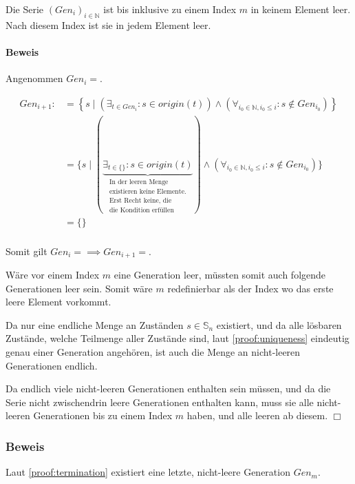 \documentclass[a4paper,10pt,ngerman]{scrartcl}
\begin{document}
Die Serie \((Gen_i)_{i\in\mathbb{N}}\) ist bis inklusive zu einem Index \(m\) in keinem Element leer. Nach diesem Index ist sie in jedem Element leer.

\paragraph{Beweis}

Angenommen \(Gen_i = {}\).

\begin{align*}
    Gen_{i+1} :&= \left\{ s \mid \left(\exists_{t \in Gen_i} : s \in origin(t)\right) \land \left(\forall_{i_0\in\mathbb{N}, i_0 \leq i}: s \notin Gen_{i_0}\right) \right\} \\
    & = \{ s \mid (\underbrace{\exists_{t \in \{\}} : s \in origin(t)}_{\substack{\text{In der leeren Menge}\\\text{existieren keine Elemente.}\\\text{Erst Recht keine, die}\\\text{die Kondition erfüllen}}}) \land (\forall_{i_0\in\mathbb{N}, i_0 \leq i}: s \notin Gen_{i_0}) \} \\
    & = \{\} \\
\end{align*}

Somit gilt \(Gen_i = {} \implies Gen_{i+1} = {}\).

Wäre vor einem Index \(m\) eine Generation leer, müssten somit auch folgende Generationen leer sein. Somit wäre \(m\) redefinierbar als der Index wo das erste leere Element vorkommt.

Da nur eine endliche Menge an Zuständen \(s \in \mathbb{S}_n\) existiert, und da alle lösbaren Zustände, welche Teilmenge aller Zustände sind, laut \cref{proof:uniqueness} eindeutig genau einer Generation angehören, ist auch die Menge an nicht-leeren Generationen endlich.

Da endlich viele nicht-leeren Generationen enthalten sein müssen, und da die Serie nicht zwischendrin leere Generationen enthalten kann, muss sie alle nicht-leeren Generationen bis zu einem Index \(m\) haben, und alle leeren ab diesem. \(\Box\)

\subsubsection{Beweis}

Laut \cref{proof:termination} existiert eine letzte, nicht-leere Generation \(Gen_m\).
\end{document}
